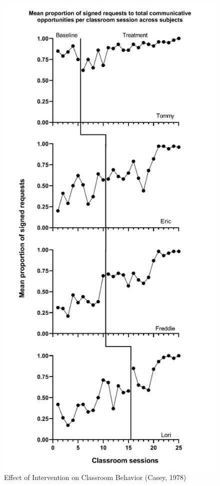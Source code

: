 \documentclass[
]{book}
\begin{document}
\begin{figure}
\includegraphics[width=0.6\linewidth]{images/Casey1978} \caption{Effect of Intervention on Classroom Behavior (Casey, 1978)}\label{fig:Casey-1978}
\end{figure}
\end{document}
